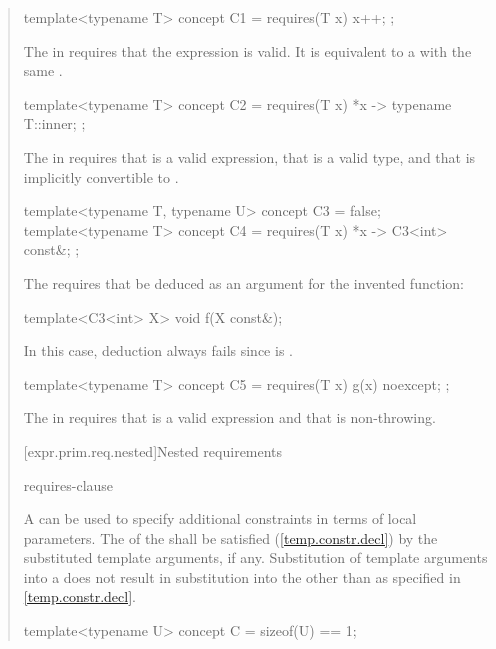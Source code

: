 \begin{quote}
\begin{addedblock}
%
\enterexample
\begin{codeblock}
template<typename T> concept C1 =
  requires(T x) {
    {x++};
  };
\end{codeblock}
The  in  
requires that the expression  is valid.
It is equivalent to a 
with the same .

\begin{codeblock}
template<typename T> concept C2 =
  requires(T x) {
    {*x} -> typename T::inner;
  };
\end{codeblock}

The  in  
requires that  is a valid expression,
that  is a valid type, and
that  is implicitly convertible to
.

\begin{codeblock}
template<typename T, typename U> concept C3 = false;
template<typename T> concept C4 =
  requires(T x) {
    {*x} -> C3<int> const&;
  };
\end{codeblock}
The  requires that  be deduced
as an argument for the invented function:
\begin{codeblock}
template<C3<int> X> void f(X const&);
\end{codeblock}
In this case, deduction always fails since  is .

\begin{codeblock}
template<typename T> concept C5 =
  requires(T x) {
    {g(x)} noexcept;
  };
\end{codeblock}

The  in  
requires that  is a valid expression and
that  is non-throwing.
\exitexample


[expr.prim.req.nested]{Nested requirements}

\begin{bnf}
\br
    requires-clause \terminal{;}
  \end{bnf}

\pnum
A  can be used
to specify additional constraints in terms of local parameters.
The  of the  
shall be satisfied (\ref{temp.constr.decl}) by the substituted template
arguments, if any.
Substitution of template arguments into a 
does not result in substitution into the 
other than as specified in \ref{temp.constr.decl}.
% 
\enterexample
\begin{codeblock}
template<typename U> concept C = sizeof(U) == 1;


\end{codeblock}
\end{addedblock}
\end{quote}
